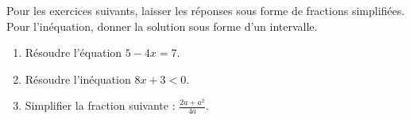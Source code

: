 
\begin{exercice}\label{exosmath-0412}

    Pour les exercices suivants, laisser les réponses sous forme de fractions simplifiées. Pour l'inéquation, donner la solution sous forme d'un intervalle.
    \begin{enumerate}
        \item
            Résoudre l'équation \( 5-4x=7\).
        \item
            Résoudre l'inéquation \( 8x+3 < 0\).
        \item
            Simplifier la fraction suivante : \( \frac{\displaystyle 2a+a^2 }{ \displaystyle 4a }\).
    \end{enumerate}

\end{exercice}

